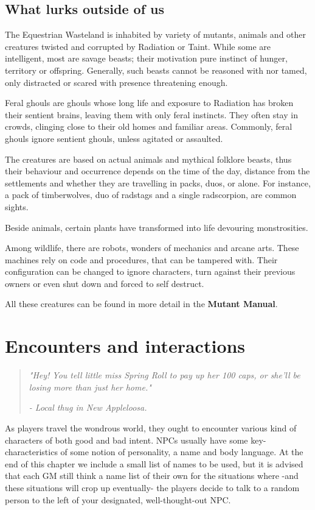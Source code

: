 \documentclass[11pt,a4paper,twocolumn]{book}
\begin{document}
    \section*{What lurks outside of us}
    The Equestrian Wasteland is inhabited by variety of mutants, animals and other creatures twisted and corrupted by Radiation or Taint. While some are intelligent, most are savage beasts; their motivation pure instinct of hunger, territory or offspring. Generally, such beasts cannot be reasoned with nor tamed, only distracted or scared with presence threatening enough. 
    
    Feral ghouls are ghouls whose long life and exposure to Radiation has broken their sentient brains, leaving them with only feral instincts. They often stay in crowds, clinging close to their old homes and familiar areas. Commonly, feral ghouls ignore sentient ghouls, unless agitated or assaulted.  
    
    The creatures are based on actual animals and mythical folklore beasts, thus their behaviour and occurrence depends on the time of the day, distance from the settlements and whether they are travelling in packs, duos, or alone. For instance, a pack of timberwolves, duo of radstags and a single radscorpion, are common sights.
    
    Beside animals, certain plants have transformed into life devouring monstrosities. 
    
    Among wildlife, there are robots, wonders of mechanics and arcane arts. These machines rely on code and procedures, that can be tampered with. Their configuration can be changed to ignore characters, turn against their previous owners or even shut down and forced to self destruct.
    
    All these creatures can be found in more detail in the \textbf{Mutant Manual}.
    
    
    
    \chapter{Encounters and interactions}
    \begin{quote}
    \emph{"Hey! You tell little miss Spring Roll to pay up her 100 caps, or she'll be losing more than just her home."}
    
    \emph{- Local thug in New Appleloosa.}
    \end{quote}
    
    As players travel the wondrous world, they ought to encounter various kind of characters of both good and bad intent. NPCs usually have some key-characteristics of some notion of personality, a name and body language. At the end of this chapter we include a small list of names to be used, but it is advised that each GM still think a name list of their own for the situations where -and these situations will crop up eventually- the players decide to talk to a random person to the left of your designated, well-thought-out NPC. 
    
\end{document}
